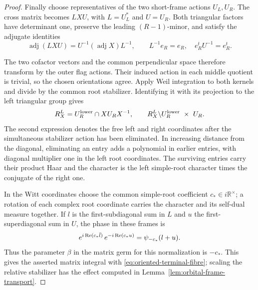 \begin{proof}
Finally choose representatives of the two short-frame actions
\(U_L,U_R\). The cross matrix becomes \(L X U\), with
\(L=U_L^*\) and \(U=U_R\). Both triangular factors have determinant
one, preserve the leading \((R-1)\)-minor, and satisfy
the adjugate identities
\[
 \operatorname{adj}(LXU)=U^{-1}(\operatorname{adj}X)L^{-1},
 \qquad L^{-1}e_R=e_R,\quad e_R^t U^{-1}=e_R^t .
\]

The two cofactor vectors and the common perpendicular space
therefore transform by the outer flag actions. Their induced action
in each middle quotient is trivial, so the chosen orientations agree.
Apply Weil integration to both kernels and divide by the common
root stabilizer. Identifying it with its projection to the left
triangular group gives
\[
         R_X^L=U_R^{\rm lower}\cap X U_R X^{-1},
         \qquad R_X^L\backslash U_R^{\rm lower}\ \times\ U_R .
\]
The second expression denotes the free left and right coordinates
after the simultaneous stabilizer action has been eliminated.
In increasing distance from the diagonal, eliminating an entry
adds a polynomial in earlier entries, with diagonal multiplier one
in the left root coordinates. The surviving entries carry their
product Haar and the character is the left simple-root character
times the conjugate of the right one.

In the Witt coordinates choose the common simple-root coefficient
\(c_*\in i\mathbb R^\times\); a rotation of each complex root
coordinate carries the character and its self-dual measure together.
If \(l\) is the first-subdiagonal sum in \(L\) and \(u\) the
first-superdiagonal sum in \(U\), the phase in these frames is
\[
 e^{i\operatorname{Re}(c_*\bar l)}\,e^{-i\operatorname{Re}(c_*u)}
        =\psi_{-c_*}(l+u).
\]
Thus the parameter \(\beta\) in the matrix germ for this normalization
is \(-c_*\). This gives the asserted
matrix integral with \eqref{eq:oriented-terminal-fibre}; scaling
the relative stabilizer has the effect computed in
Lemma~\ref{lem:orbital-frame-transport}.
\end{proof}

